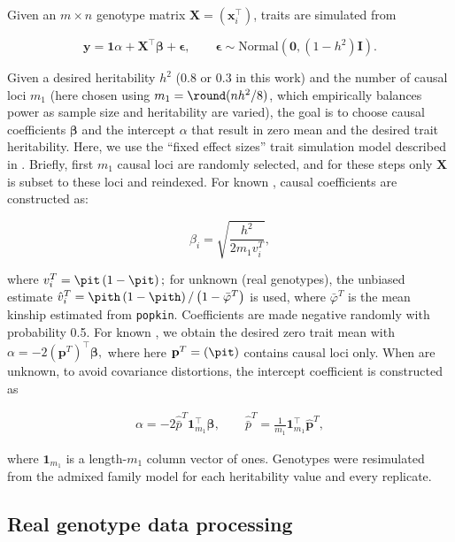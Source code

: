 \documentclass[11pt]{article}
\begin{document}
\begin{linenumbers}
Given an $m \times n$ genotype matrix $\mathbf{X} = (\mathbf{x}_i^\intercal)$, traits are simulated from
\begin{linenomath*}
$$
\mathbf{y}
=
\mathbf{1} \alpha + \mathbf{X}^\intercal \boldsymbol{\beta} + \boldsymbol{\epsilon}
, \quad\quad
\boldsymbol{\epsilon} \sim \text{Normal}(\mathbf{0}, (1 - h^2) \mathbf{I})
.
$$
\end{linenomath*}
Given a desired heritability $h^2$ (0.8 or 0.3 in this work) and the number of causal loci $m_1$ (here chosen using $m_1 = \round( n h^2 / 8 )$, which empirically balances power as sample size and heritability are varied), the goal is to choose causal coefficients $\boldsymbol{\beta}$ and the intercept $\alpha$ that result in zero mean and the desired trait heritability.
Here, we use the ``fixed effect sizes'' trait simulation model described in \citep{yao_limitations_2022}.
Briefly, first $m_1$ causal loci are randomly selected, and for these steps only $\mathbf{X}$ is subset to these loci and reindexed.
For known \pit, causal coefficients are constructed as:
\begin{linenomath*}
$$
\beta_i = \sqrt{ \frac{h^2}{ 2 m_1 v_i^T } },
$$
\end{linenomath*}
where
$
v_i^T
=
\pit \left( 1 - \pit \right)
;
$
for unknown \pit (real genotypes), the unbiased estimate
$
\hat{v}_i^T
=
\pith \left( 1 - \pith \right) / \left( 1 - \bar{\varphi}^T \right)
$
is used, where $\bar{\varphi}^T$ is the mean kinship estimated from \texttt{popkin}.
Coefficients are made negative randomly with probability 0.5.
For known \pit, we obtain the desired zero trait mean with
$
\alpha 
=
- 2 \left( \mathbf{p}^T \right)^\intercal \boldsymbol{\beta}
,
$
where here $\mathbf{p}^T = (\pit)$ contains causal loci only.
When \pit are unknown, to avoid covariance distortions, the intercept coefficient is constructed as
\begin{linenomath*}
\begin{align*}
  \alpha 
  =
  - 2 \hat{\bar{p}}^T \mathbf{1}_{m_1}^\intercal \boldsymbol{\beta}
  , \quad\quad
  \hat{\bar{p}}^T
  =
  \frac{1}{m_1} \mathbf{1}_{m_1}^\intercal \mathbf{\hat{p}}^T
  ,
\end{align*}
\end{linenomath*}
where $\mathbf{1}_{m_1}$ is a length-$m_1$ column vector of ones.
Genotypes were resimulated from the admixed family model for each heritability value and every replicate.

\subsection{Real genotype data processing}


\end{linenumbers}
\end{document}
